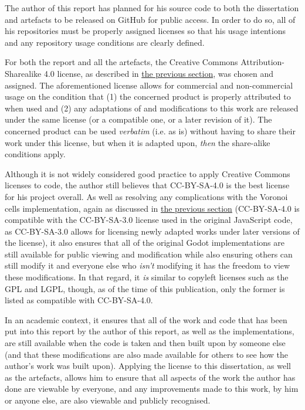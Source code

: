The author of this report has planned for his source code to both the dissertation and artefacts to be released on GitHub for public access. In order to do so, all of his repositories must be properly assigned licenses so that his usage intentions and any repository usage conditions are clearly defined. 

For both the report and all the artefacts, the Creative Commons Attribution-Sharealike 4.0 license, as described in \hyperref[howuse]{the previous section}, was chosen and assigned. The aforementioned license allows for commercial and non-commercial usage on the condition that (1) the concerned product is properly attributed to when used and (2) any adaptations of and modifications to this work are released under the same license (or a compatible one, or a later revision of it).\cite{cc_at_sa_4} The concerned product can be used \textit{verbatim} (i.e. as is) without having to share their work under this license, but when it is adapted upon, \textit{then} the share-alike conditions apply.

Although it is not widely considered good practice to apply Creative Commons licenses to code\cite{cc_faq_code}, the author still believes that CC-BY-SA-4.0 is the best license for his project overall. As well as resolving any complications with the Voronoi cells implementation, again as discussed in \hyperref[howuse]{the previous section} (CC-BY-SA-4.0 is compatible with the CC-BY-SA-3.0 license used in the original JavaScript code, as CC-BY-SA-3.0 allows for licensing newly adapted works under later versions of the license\cite{cc_compat}), it also ensures that all of the original Godot implementations are still available for public viewing and modification while also ensuring others can still modify it and everyone else who \textit{isn't} modifying it has the freedom to view these modifications. In that regard, it \textit{is} similar to copyleft licenses such as the GPL and LGPL, though, as of the time of this publication, only the former is listed as compatible with CC-BY-SA-4.0.\cite{cc_compat}

In an academic context, it ensures that all of the work and code that has been put into this report by the author of this report, as well as the implementations, are still available when the code is taken and then built upon by someone else (and that these modifications are also made available for others to see how the author's work was built upon). Applying the license to this dissertation, as well as the artefacts, allows him to ensure that all aspects of the work the author has done are viewable by everyone, and any improvements made to this work, by him or anyone else, are also viewable and publicly recognised.

